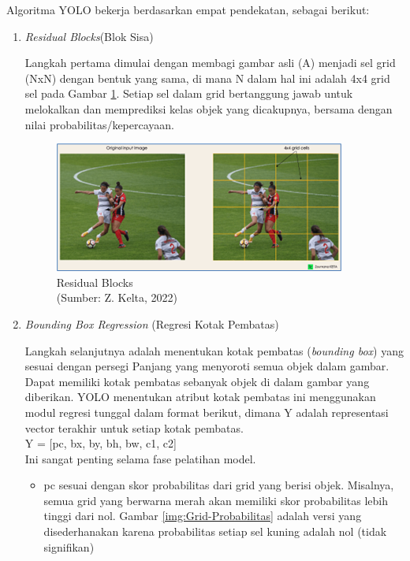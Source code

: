 Algoritma YOLO bekerja berdasarkan empat pendekatan, sebagai berikut:
\begin{enumerate}[label=(\alph*)]
	\item \textit{Residual Blocks}(Blok Sisa)
	
	Langkah pertama dimulai dengan membagi gambar asli (A) menjadi sel grid (NxN) dengan bentuk yang sama, di mana N dalam hal ini adalah 4x4 grid sel pada Gambar \ref{img:Residual-Blocks}. Setiap sel dalam grid bertanggung jawab untuk melokalkan dan memprediksi kelas objek yang dicakupnya, bersama dengan nilai probabilitas/kepercayaan.
	
	\begin{figure}[H]
		\vspace{-0.1cm}
		\begin{center}
			\includegraphics[width=0.9\columnwidth]{bab2/Gambar/Picture32.png}
		\end{center}
		\vspace{-0.2cm}
		\captionsetup{justification=centering}
		\caption{Residual Blocks\\(Sumber: Z. Kelta, 2022)}\label{img:Residual-Blocks}
	\end{figure}
	
	\item \textit{Bounding Box Regression} (Regresi Kotak Pembatas)
	
	Langkah selanjutnya adalah menentukan kotak pembatas (\textit{bounding box}) yang sesuai dengan persegi Panjang yang menyoroti semua objek dalam gambar. Dapat memiliki kotak pembatas sebanyak objek di dalam gambar yang diberikan. YOLO menentukan atribut kotak pembatas ini menggunakan modul regresi tunggal dalam format berikut, dimana Y adalah representasi vector terakhir untuk setiap kotak pembatas.\\
	Y = [pc, bx, by, bh, bw, c1, c2]\\
	Ini sangat penting selama fase pelatihan model.
	\begin{itemize}
		\item pc sesuai dengan skor probabilitas dari grid yang berisi objek. Misalnya, semua grid yang berwarna merah akan memiliki skor probabilitas lebih tinggi dari nol. Gambar \ref{img:Grid-Probabilitas} adalah versi yang disederhanakan karena probabilitas setiap sel kuning adalah nol (tidak signifikan)
		

\end{itemize}
\end{enumerate}
